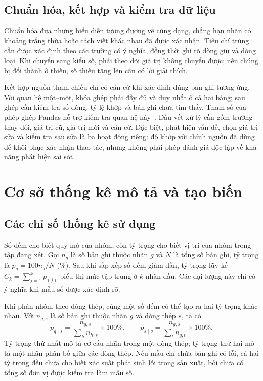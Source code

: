 \documentclass[12pt,a4paper,oneside]{report}
\newcommand{\tenCot}[1]{\texttt{\detokenize{#1}}}
\begin{document}
\subsection{Chuẩn hóa, kết hợp và kiểm tra dữ liệu}

Chuẩn hóa đưa những biểu diễn tương đương về cùng dạng, chẳng hạn nhãn có khoảng trắng thừa hoặc cách viết khác nhau đã được xác nhận. Tiêu chí trùng cần được xác định theo các trường có ý nghĩa, đồng thời ghi rõ dòng giữ và dòng loại. Khi chuyển sang kiểu số, phải theo dõi giá trị không chuyển được; nếu chúng bị đổi thành ô thiếu, số thiếu tăng lên cần có lời giải thích.

Kết hợp nguồn tham chiếu chỉ có căn cứ khi xác định đúng bản ghi tương ứng. Với quan hệ một--một, khóa ghép phải đầy đủ và duy nhất ở cả hai bảng; sau ghép cần kiểm tra số dòng, tỷ lệ khớp và bản ghi chưa tìm thấy. Tham số \tenCot{validate} của phép ghép Pandas hỗ trợ kiểm tra quan hệ này~\cite{pandasmerge}. Dấu vết xử lý cần gồm trường thay đổi, giá trị cũ, giá trị mới và căn cứ. Đặc biệt, phát hiện vấn đề, chọn giá trị sửa và kiểm tra sau sửa là ba hoạt động riêng: độ khớp với chính nguồn đã dùng để khôi phục xác nhận thao tác, nhưng không phải phép đánh giá độc lập về khả năng phát hiện sai sót.

\section{Cơ sở thống kê mô tả và tạo biến}
\label{sec:thongke}

\subsection{Các chỉ số thống kê sử dụng}

Số đếm cho biết quy mô của nhóm, còn tỷ trọng cho biết vị trí của nhóm trong tập đang xét. Gọi $n_g$ là số bản ghi thuộc nhãn $g$ và $N$ là tổng số bản ghi, tỷ trọng là $p_g=100n_g/N$ (\%). Sau khi sắp xếp số đếm giảm dần, tỷ trọng lũy kế $C_k=\sum_{j=1}^{k}p_{(j)}$ biểu thị mức tập trung ở $k$ nhãn đầu. Các đại lượng này chỉ có ý nghĩa khi mẫu số được xác định rõ.

Khi phân nhóm theo dòng thép, cùng một số đếm có thể tạo ra hai tỷ trọng khác nhau. Với $n_{g,s}$ là số bản ghi thuộc nhãn $g$ và dòng thép $s$, ta có
\begin{equation}
  p_{g\mid s}=\frac{n_{g,s}}{\sum_h n_{h,s}}\times100\%,
  \qquad
  p_{s\mid g}=\frac{n_{g,s}}{\sum_t n_{g,t}}\times100\%.
  \label{eq:tytronghaichieu}
\end{equation}
Tỷ trọng thứ nhất mô tả cơ cấu nhãn trong một dòng thép; tỷ trọng thứ hai mô tả một nhãn phân bố giữa các dòng thép. Nếu mẫu chỉ chứa bản ghi có lỗi, cả hai tỷ trọng đều chưa cho biết xác suất phát sinh lỗi trong sản xuất, bởi chưa có tổng số đơn vị được kiểm tra làm mẫu số.
\end{document}
